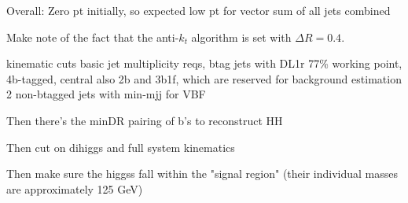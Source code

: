         Overall:
            Zero pt initially, so expected low pt for vector sum of all jets combined
            

        Make note of the fact that the anti-$k_t$ algorithm is set with $\Delta R = 0.4$.

    kinematic cuts
        basic jet multiplicity reqs,
        btag jets with DL1r 77\% working point,
        4b-tagged, central
        also 2b and 3b1f, which are reserved for background estimation
        2 non-btagged jets with min-mjj for VBF

    Then there's the minDR pairing of b's to reconstruct HH

    Then cut on dihiggs and full system kinematics

    Then make sure the higgss fall within the "signal region" (their individual masses are approximately 125 GeV)


%
